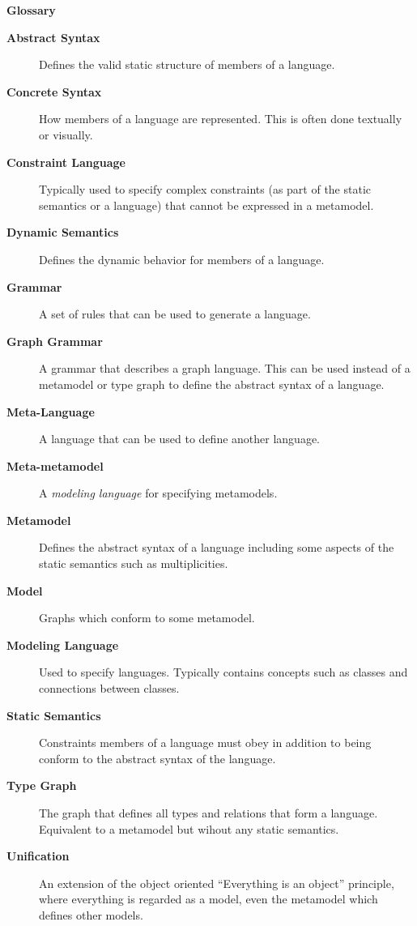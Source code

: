 \newpage
{}
{}

\vspace{1cm}
{\Huge \bf Glossary}
\vspace{1cm}

\begin{description}

\item[\bf Abstract Syntax] 
Defines the valid static structure of members of a language. 

\item[\bf Concrete Syntax]
How members of a language are represented. This is often done textually or visually.

\item[\bf Constraint Language] 
Typically used to specify complex constraints (as part of the static semantics or a language) that cannot be expressed in a metamodel.

\item[\bf Dynamic Semantics] 
Defines the dynamic behavior for members of a language.

\item[\bf Grammar] 
A set of rules that can be used to generate a language. 

\item[\bf Graph Grammar] 
A grammar that describes a graph language. This can be used instead of a metamodel or type graph to define the abstract syntax of a language.

\item[\bf Meta-Language] 
A language that can be used to define another language.

\item[\bf Meta-metamodel] 
A \emph{modeling language} for specifying metamodels.

\item[\bf Metamodel] 
Defines the abstract syntax of a language including some aspects of the static semantics such as multiplicities. 

\item[\bf Model] 
Graphs which conform to some metamodel.

\item[\bf Modeling Language] 
Used to specify languages. Typically contains concepts such as classes and connections between classes.

\item[\bf Static Semantics] 
Constraints members of a language must obey in addition to being conform to the abstract syntax of the language.

\item[\bf Type Graph] 
The graph that defines all types and relations that form a language. Equivalent to a metamodel but wihout any static semantics.

\item[\bf Unification]  
An extension of the object oriented ``Everything is an object'' principle, where everything is regarded as a model, even the metamodel which defines other
models.


\end{description}